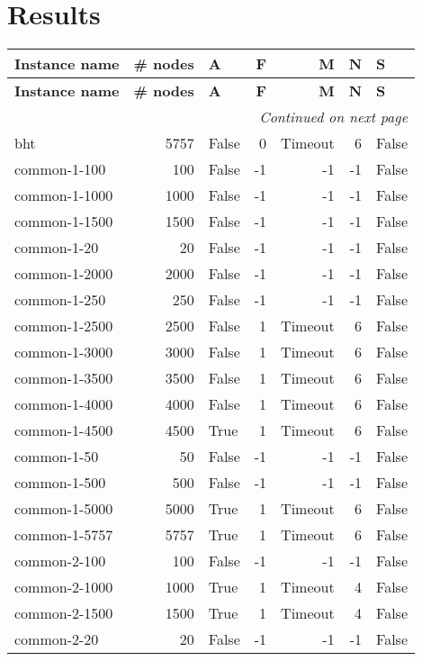 \section{Results}
\begin{longtable}{lrlrrrl}\toprule \textbf{Instance name}& \textbf{\# nodes}& \textbf{A}& \textbf{F}& \textbf{M}& \textbf{N}& \textbf{S}\\
\midrule
\endfirsthead
\toprule
 \textbf{Instance name}& \textbf{\# nodes}& \textbf{A}& \textbf{F}& \textbf{M}& \textbf{N}& \textbf{S}\\
\midrule
\endhead
\midrule
\multicolumn{7}{r}{\textit{Continued on next page}} \\
\midrule
\endfoot
\bottomrule
\endlastfoot
bht & 5757 & False & 0 & Timeout & 6 & False \\
common-1-100 & 100 & False & -1 & -1 & -1 & False \\
common-1-1000 & 1000 & False & -1 & -1 & -1 & False \\
common-1-1500 & 1500 & False & -1 & -1 & -1 & False \\
common-1-20 & 20 & False & -1 & -1 & -1 & False \\
common-1-2000 & 2000 & False & -1 & -1 & -1 & False \\
common-1-250 & 250 & False & -1 & -1 & -1 & False \\
common-1-2500 & 2500 & False & 1 & Timeout & 6 & False \\
common-1-3000 & 3000 & False & 1 & Timeout & 6 & False \\
common-1-3500 & 3500 & False & 1 & Timeout & 6 & False \\
common-1-4000 & 4000 & False & 1 & Timeout & 6 & False \\
common-1-4500 & 4500 & True & 1 & Timeout & 6 & False \\
common-1-50 & 50 & False & -1 & -1 & -1 & False \\
common-1-500 & 500 & False & -1 & -1 & -1 & False \\
common-1-5000 & 5000 & True & 1 & Timeout & 6 & False \\
common-1-5757 & 5757 & True & 1 & Timeout & 6 & False \\
common-2-100 & 100 & False & -1 & -1 & -1 & False \\
common-2-1000 & 1000 & True & 1 & Timeout & 4 & False \\
common-2-1500 & 1500 & True & 1 & Timeout & 4 & False \\
common-2-20 & 20 & False & -1 & -1 & -1 & False \\

\end{longtable}
